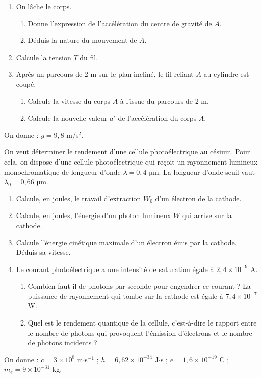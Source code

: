 \documentclass[11pt]{article}
\begin{document}
\begin{enumerate}
  \item On lâche le corps.
  \begin{enumerate}[label=\alph*.]
    \item Donne l'expression de l'accélération du centre de gravité de $A$.
    \item Déduis la nature du mouvement de $A$.
  \end{enumerate}
  \item Calcule la tension $T$ du fil.
  \item Après un parcours de 2 m sur le plan incliné, le fil reliant $A$ au cylindre est coupé.
  \begin{enumerate}[label=\alph*.]
    \item Calcule la vitesse du corps $A$ à l'issue du parcours de 2 m.
    \item Calcule la nouvelle valeur $a'$ de l'accélération du corps $A$.
  \end{enumerate}
\end{enumerate}
\noindent On donne : $g = 9{,}8$ m/s$^2$.

On veut déterminer le rendement d'une cellule photoélectrique au césium. Pour cela, on dispose d'une cellule photoélectrique qui reçoit un rayonnement lumineux monochromatique de longueur d'onde $\lambda = 0{,}4$ µm. La longueur d'onde seuil vaut $\lambda_0 = 0{,}66$ µm.

\begin{enumerate}
  \item Calcule, en joules, le travail d'extraction $W_0$ d'un électron de la cathode.
  \item Calcule, en joules, l'énergie d'un photon lumineux $W$ qui arrive sur la cathode.
  \item Calcule l'énergie cinétique maximale d'un électron émis par la cathode. Déduis sa vitesse.
  \item Le courant photoélectrique a une intensité de saturation égale à $2{,}4\times10^{-9}$ A.
  \begin{enumerate}[label=4.\arabic*.]
    \item Combien faut-il de photons par seconde pour engendrer ce courant ? La puissance de rayonnement qui tombe sur la cathode est égale à $7{,}4\times10^{-7}$ W.
    \item Quel est le rendement quantique de la cellule, c'est-à-dire le rapport entre le nombre de photons qui provoquent l'émission d'électrons et le nombre de photons incidents ?
  \end{enumerate}
\end{enumerate}
\noindent On donne : $c = 3\times10^8$ m$\cdot$s$^{-1}$ ; $h = 6{,}62\times10^{-34}$ J$\cdot$s ; $e = 1{,}6\times10^{-19}$ C ; $m_e = 9\times10^{-31}$ kg.
\end{document}
